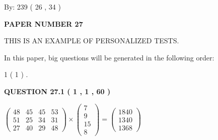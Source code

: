 \documentclass[12pt]{article}
\begin{document}
   
\hspace{1.0in} By: 
         239 (          26 ,           34 )
   
   
   
   
\newpage 
\setcounter{page}{ 
    27001 } 
   
   
   
   
 {\textbf{ \Large{ PAPER NUMBER           27  }}}
   
   
\vspace{0.2in}
   
   
   
   
   
   
 \vspace{0.2in}
{\Huge  THIS IS AN EXAMPLE OF}
{\Huge  PERSONALIZED TESTS. }
   
   
   
\vspace{0.2in}
   
In this paper, big questions will be generated in the following order: 
   
   
             1 (           1 )
 .
  
\vspace{0.2in}
  
{\textbf{\Large{QUESTION
27.1 
 (           1 ,           1 ,          60 )
}}}
  
  
 
 
\noindent{}

 
$\left( \begin{array}{ccccccccccccccc}
          48  & 
          45  & 
          45  & 
          53  \\ 
          51  & 
          25  & 
          34  & 
          31  \\ 
          27  & 
          40  & 
          29  & 
          48
\end{array}\right) \times
\left( \begin{array}{c}
           7  \\ 
           9  \\ 
          15  \\ 
           8
\end{array}\right)  =
\left( \begin{array}{c}
        1840  \\ 
        1340  \\ 
        1368
\end{array}\right)  $
 
\end{document}
